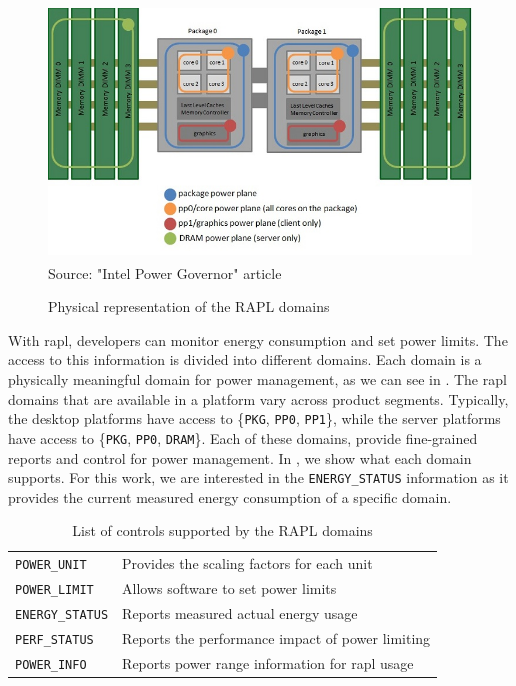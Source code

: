 \begin{savenotes}
\begin{figure}[htp]
  \centering
  \caption{Physical representation of the RAPL domains}
  \includegraphics[width=\columnwidth]{images/power-planes-placeholder}
  \footnotesize{Source: "Intel\textsuperscript{\textregistered} Power Governor" article~\cite{dimitrov:2012}}
  \label{fig:power-planes}
\end{figure}
\end{savenotes}

With \ac{rapl}, developers can monitor energy consumption and set power limits. The access to this information is divided into different domains. Each domain is a physically meaningful domain for power management, as we can see in . The \ac{rapl} domains that are available in a platform vary across product segments. Typically, the desktop platforms have access to \{\texttt{PKG}, \texttt{PP0}, \texttt{PP1}\}, while the server platforms have access to \{\texttt{PKG}, \texttt{PP0}, \texttt{DRAM}\}. Each of these domains, provide fine-grained reports and control for power management. In , we show what each domain supports. For this work, we are interested in the \texttt{ENERGY\_STATUS} information as it provides the current measured energy consumption of a specific domain.

\begin{table}[htp]
	\centering
	\caption{List of controls supported by the RAPL domains}
	\begin{tabular}{ll}
	  \toprule
		\texttt{POWER\_UNIT}    & Provides the scaling factors for each unit\\
		\texttt{POWER\_LIMIT}   & Allows software to set power limits\\
		\texttt{ENERGY\_STATUS} & Reports measured actual energy usage\\
		\texttt{PERF\_STATUS}   & Reports the performance impact of power limiting\\
		\texttt{POWER\_INFO}    & Reports power range information for \ac{rapl} usage\\
	  \bottomrule
	\end{tabular}
	\label{tbl:rapl-domains}
\end{table}

